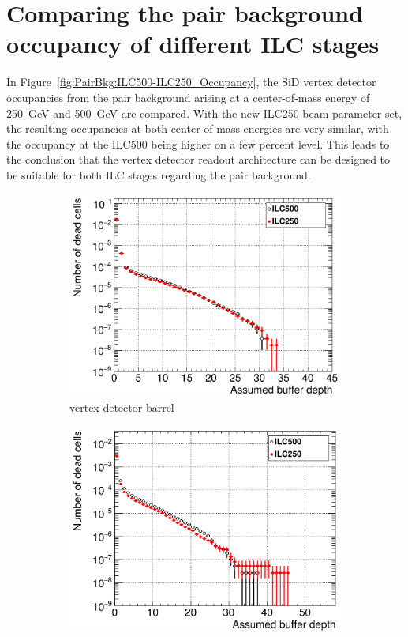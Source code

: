  
\section{Comparing the pair background occupancy of different ILC stages}

In Figure~\ref{fig:PairBkg:ILC500-ILC250_Occupancy}, the SiD vertex detector occupancies from the pair background arising at a center-of-mass energy of \SI{250}{\GeV} and \SI{500}{\GeV} are compared.
With the new ILC250 beam parameter set, the resulting occupancies at both center-of-mass energies are very similar, with the occupancy at the ILC500 being higher on a few percent level.
This leads to the conclusion that the vertex detector readout architecture can be designed to be suitable for both ILC stages regarding the pair background.

 \begin{figure}
 \centering
  \begin{subfigure}[b]{0.49\textwidth}
   \centering
    \includegraphics[width=\textwidth]{Figures/Pairs/Occupancy_Comparison_Layer_0_deadcells_ILC500vsILC250.png}
   \caption{\sid vertex detector barrel}
   \end{subfigure}
   \hfill
    \begin{subfigure}[b]{0.49\textwidth}
   \centering
    \includegraphics[width=\textwidth]{Figures/Pairs/Occupancy_Comparison_Layer_0_deadcells_ILC500vsILC250_SiVertexEndcap.png}

\end{subfigure}
\end{figure}
